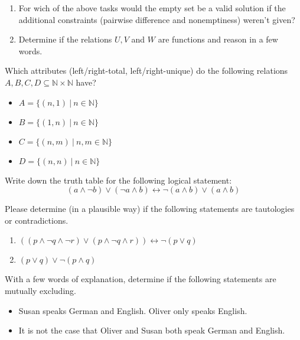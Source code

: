 \documentclass{exercise}
\begin{document}
    \begin{enumerate}
      \item For wich of the above tasks would the empty set be a valid solution if the additional constraints (pairwise difference and nonemptiness) weren't given?

      \item Determine if the relations $U, V$ and $W$ are functions and reason in a few words.

    \end{enumerate}

   Which attributes (left/right-total, left/right-unique) do the following relations $A, B, C, D \subseteq \mathbb{N} \times \mathbb{N}$ have?
    \begin{itemize}
      \item $A = \{(n, 1) \: | \: n \in \mathbb{N}\}$
      
      \item $B = \{(1, n) \: | \: n \in \mathbb{N}\}$
      
      \item $C = \{(n, m) \: | \: n,m \in \mathbb{N}\}$
      
      \item $D = \{(n, n) \: | \: n \in \mathbb{N}\}$

    \end{itemize}

   Write down the truth table for the following logical statement:
    $$(a \wedge \neg b) \vee (\neg a \wedge b) \leftrightarrow \neg (a \wedge b) \vee (a \wedge b)$$

   Please determine (in a plausible way) if the following statements are tautologies or contradictions.
    \begin{enumerate}
      \item $((p \wedge \neg q \wedge \neg r) \vee (p \wedge \neg q \wedge r)) \leftrightarrow \neg(p \vee q)$

      \item $(p \vee q) \vee \neg(p \wedge q)$

    \end{enumerate}

   With a few words of explanation, determine if the following statements are mutually excluding.
    \begin{itemize}
      \item Susan speaks German and English. Oliver only speaks English.
      \item It is not the case that Oliver and Susan both speak German and English.
    \end{itemize}
    
\end{document}
